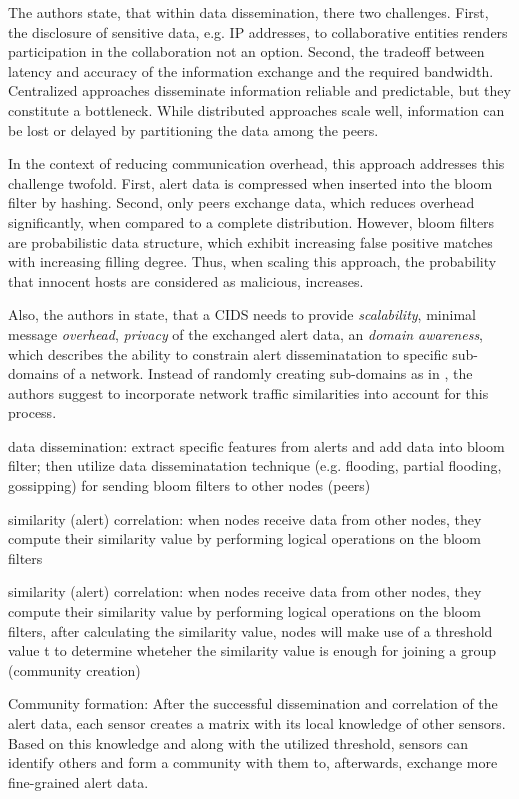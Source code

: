 The authors state, that within data dissemination, there two challenges. First, the disclosure of sensitive data, e.g. IP addresses, to collaborative entities renders participation in the collaboration not an option. Second, the tradeoff between latency and accuracy of the information exchange and the required bandwidth. Centralized approaches disseminate information reliable and predictable, but they constitute a bottleneck. While distributed approaches scale well, information can be lost or delayed by partitioning the data among the peers.

In the context of reducing communication overhead, this approach addresses this challenge twofold. First, alert data is compressed when inserted into the bloom filter by hashing. Second, only peers exchange data, which reduces overhead significantly, when compared to a complete distribution. However, bloom filters are probabilistic data structure, which exhibit increasing false positive matches with increasing filling degree. Thus, when scaling this approach, the probability that innocent hosts are considered as malicious, increases. 

Also, the authors in \cite{Vasilomanolakis2015SkipMon} state, that a CIDS needs to provide \textit{scalability}, minimal message \textit{overhead}, \textit{privacy} of the exchanged alert data, an \textit{domain awareness}, which describes the ability to constrain alert disseminatation to specific sub-domains of a network. Instead of randomly creating sub-domains as in \cite{Locasto2005}, the authors suggest to incorporate network traffic similarities into account for this process. 

data dissemination: extract specific features from alerts and add data into bloom filter; then utilize data disseminatation technique (e.g. flooding, partial flooding, gossipping) for sending bloom filters to other nodes (peers)

similarity (alert) correlation: when nodes receive data from other nodes, they compute their similarity value by performing logical operations on the bloom filters

similarity (alert) correlation: when nodes receive data from other nodes, they compute their similarity value by performing logical operations on the bloom filters, after calculating the similarity value, nodes will make use of a threshold value t to determine wheteher the similarity value is enough for joining a group (community creation)

Community formation: After the successful dissemination and correlation of the alert data, each sensor creates a matrix with its local knowledge of other sensors. Based on this knowledge and along with the utilized threshold, sensors can identify others and form a community with them to, afterwards, exchange more fine-grained alert data.

